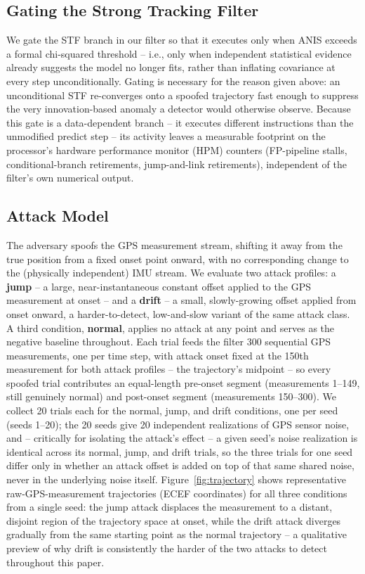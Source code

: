 \documentclass[conference]{IEEEtran}
\begin{document}
\subsection{Gating the Strong Tracking Filter}
\label{sec:gating}

We gate the STF branch in our filter so that it executes only when ANIS exceeds a formal chi-squared threshold -- i.e., only when independent statistical evidence already suggests the model no longer fits, rather than inflating covariance at every step unconditionally. Gating is necessary for the reason given above: an unconditional STF re-converges onto a spoofed trajectory fast enough to suppress the very innovation-based anomaly a detector would otherwise observe. Because this gate is a data-dependent branch -- it executes different instructions than the unmodified predict step -- its activity leaves a measurable footprint on the processor's hardware performance monitor (HPM) counters (FP-pipeline stalls, conditional-branch retirements, jump-and-link retirements), independent of the filter's own numerical output.

\subsection{Attack Model}
\label{sec:attack-model}

The adversary spoofs the GPS measurement stream, shifting it away from the true position from a fixed onset point onward, with no corresponding change to the (physically independent) IMU stream. We evaluate two attack profiles: a \textbf{jump} -- a large, near-instantaneous constant offset applied to the GPS measurement at onset -- and a \textbf{drift} -- a small, slowly-growing offset applied from onset onward, a harder-to-detect, low-and-slow variant of the same attack class. A third condition, \textbf{normal}, applies no attack at any point and serves as the negative baseline throughout. Each trial feeds the filter 300 sequential GPS measurements, one per time step, with attack onset fixed at the 150th measurement for both attack profiles -- the trajectory's midpoint -- so every spoofed trial contributes an equal-length pre-onset segment (measurements 1--149, still genuinely normal) and post-onset segment (measurements 150--300). We collect 20 trials each for the normal, jump, and drift conditions, one per seed (seeds 1--20); the 20 seeds give 20 independent realizations of GPS sensor noise, and -- critically for isolating the attack's effect -- a given seed's noise realization is identical across its normal, jump, and drift trials, so the three trials for one seed differ only in whether an attack offset is added on top of that same shared noise, never in the underlying noise itself. Figure~\ref{fig:trajectory} shows representative raw-GPS-measurement trajectories (ECEF coordinates) for all three conditions from a single seed: the jump attack displaces the measurement to a distant, disjoint region of the trajectory space at onset, while the drift attack diverges gradually from the same starting point as the normal trajectory -- a qualitative preview of why drift is consistently the harder of the two attacks to detect throughout this paper.
\end{document}
